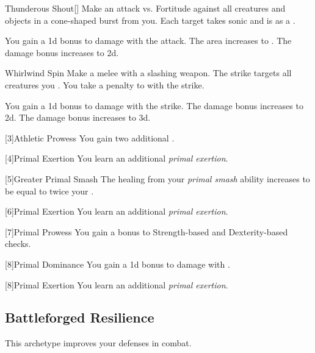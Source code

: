 {            \begin{apability}{Thunderous Shout}[]
                Make an attack vs. Fortitude against all creatures and objects in a \areamed cone-shaped burst from you.
                \hit Each target takes sonic  and is  as a .

                \rankline
                 You gain a \plus1d bonus to damage with the attack.
                 The area increases to \arealarge.
                 The damage bonus increases to \plus2d.
            \end{apability}

            \begin{apability}{Whirlwind Spin}
                Make a melee  with a slashing weapon.
                The strike targets all creatures you .
                You take a  penalty to  with the strike.

                \rankline
                 You gain a \plus1d bonus to damage with the strike.
                 The damage bonus increases to \plus2d.
                 The damage bonus increases to \plus3d.
            \end{apability}
        }

        [3]{Athletic Prowess} You gain two additional .

        [4]{Primal Exertion}
        You learn an additional \textit{primal exertion}.

        [5]{Greater Primal Smash} The healing from your \textit{primal smash} ability increases to be equal to twice your .

        [6]{Primal Exertion}
        You learn an additional \textit{primal exertion}.

        [7]{Primal Prowess}
        You gain a  bonus to Strength-based and Dexterity-based checks.

        [8]{Primal Dominance}
        You gain a \plus1d bonus to damage with .

        [8]{Primal Exertion}
        You learn an additional \textit{primal exertion}.

    \subsection{Battleforged Resilience}
        This archetype improves your defenses in combat.


